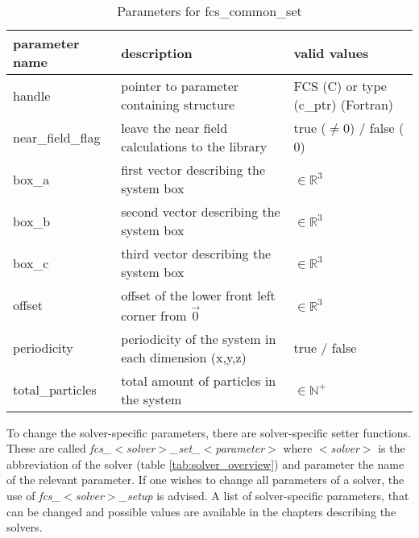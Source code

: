 \begin{table}
\begin{center}
\begin{tabular}{|p{}|p{}|p{}|}
          \hline
          parameter name        &       description                                         &   valid values                        \\
          \hline
          handle                &       pointer to parameter containing structure           &   FCS (C) or type (c\_ptr) (Fortran)   \\
          \hline
          near\_field\_flag    &       leave the near field calculations to the library    &   true ($\neq 0$) / false ($0$)       \\
          \hline
          box\_a                &       first vector describing the system box              &   $\in \mathbb{R}^3$                  \\
          \hline
          box\_b                &       second vector describing the system box             &   $\in \mathbb{R}^3$                  \\
          \hline
          box\_c                &       third vector describing the system box              &   $\in \mathbb{R}^3$                  \\
          \hline
          offset                &       offset of the lower front left corner from $\vec{0}$&   $\in \mathbb{R}^3$                  \\
          \hline
          periodicity           &       periodicity of the system in each dimension (x,y,z) &   true / false                        \\
          \hline
          total\_particles      &       total amount of particles in the system             &   $\in \mathbb{N}^+$                  \\
          \hline 
\end{tabular}
\end{center}
\caption{Parameters for fcs\_common\_set}
\label{tab:fcs_common_set_parameters}
\end{table}

To change the solver-specific parameters, there are solver-specific setter functions. These are called \textit{fcs\_$<$solver$>$\_set\_$<$parameter$>$} where 
\textit{$<$solver$>$} is the abbreviation of the solver (table \ref{tab:solver_overview}) and parameter the name of the relevant parameter. If one wishes to change all parameters of
a solver, the use of \textit{fcs\_$<$solver$>$\_setup} is advised. A list of solver-specific parameters, that can be changed and possible values are available
in the chapters describing the solvers.

